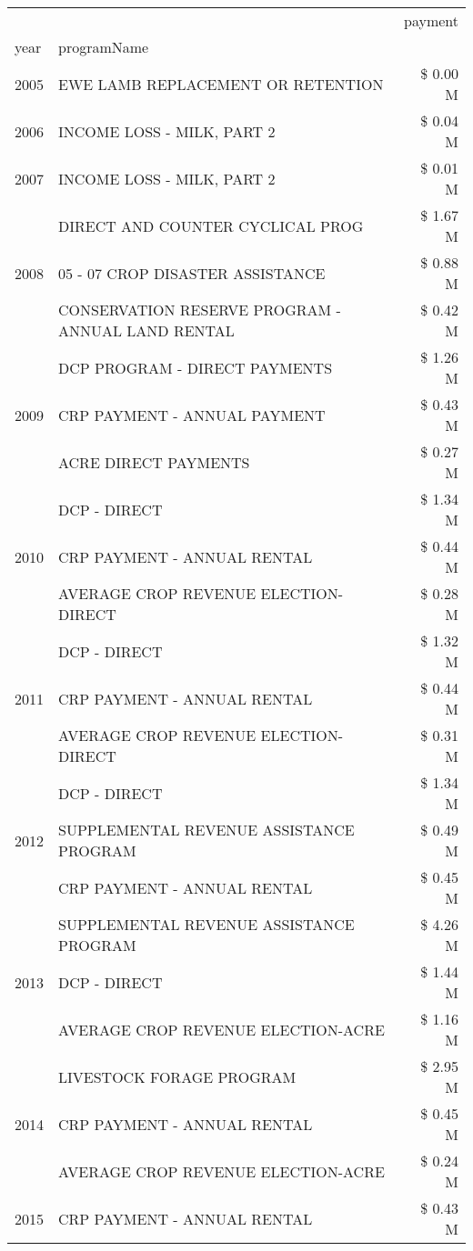 \begin{tabular}{llr}
\toprule
 &  & payment \\
year & programName &  \\
\midrule
2005 & EWE LAMB REPLACEMENT OR RETENTION & \$ 0.00 M \\
\cline{1-3}
2006 & INCOME LOSS - MILK, PART 2 & \$ 0.04 M \\
\cline{1-3}
2007 & INCOME LOSS - MILK, PART 2 & \$ 0.01 M \\
\cline{1-3}
\multirow[t]{3}{*}{2008} & DIRECT AND COUNTER CYCLICAL PROG & \$ 1.67 M \\
 & 05 - 07 CROP DISASTER ASSISTANCE & \$ 0.88 M \\
 & CONSERVATION RESERVE PROGRAM - ANNUAL LAND RENTAL & \$ 0.42 M \\
\cline{1-3}
\multirow[t]{3}{*}{2009} & DCP PROGRAM - DIRECT PAYMENTS & \$ 1.26 M \\
 & CRP PAYMENT - ANNUAL PAYMENT & \$ 0.43 M \\
 & ACRE DIRECT PAYMENTS & \$ 0.27 M \\
\cline{1-3}
\multirow[t]{3}{*}{2010} & DCP - DIRECT & \$ 1.34 M \\
 & CRP PAYMENT - ANNUAL RENTAL & \$ 0.44 M \\
 & AVERAGE CROP REVENUE ELECTION-DIRECT & \$ 0.28 M \\
\cline{1-3}
\multirow[t]{3}{*}{2011} & DCP - DIRECT & \$ 1.32 M \\
 & CRP PAYMENT - ANNUAL RENTAL & \$ 0.44 M \\
 & AVERAGE CROP REVENUE ELECTION-DIRECT & \$ 0.31 M \\
\cline{1-3}
\multirow[t]{3}{*}{2012} & DCP - DIRECT & \$ 1.34 M \\
 & SUPPLEMENTAL REVENUE ASSISTANCE PROGRAM & \$ 0.49 M \\
 & CRP PAYMENT - ANNUAL RENTAL & \$ 0.45 M \\
\cline{1-3}
\multirow[t]{3}{*}{2013} & SUPPLEMENTAL REVENUE ASSISTANCE PROGRAM & \$ 4.26 M \\
 & DCP - DIRECT & \$ 1.44 M \\
 & AVERAGE CROP REVENUE ELECTION-ACRE & \$ 1.16 M \\
\cline{1-3}
\multirow[t]{3}{*}{2014} & LIVESTOCK FORAGE PROGRAM & \$ 2.95 M \\
 & CRP PAYMENT - ANNUAL RENTAL & \$ 0.45 M \\
 & AVERAGE CROP REVENUE ELECTION-ACRE & \$ 0.24 M \\
\cline{1-3}
\multirow[t]{3}{*}{2015} & CRP PAYMENT - ANNUAL RENTAL & \$ 0.43 M \\

\end{tabular}
